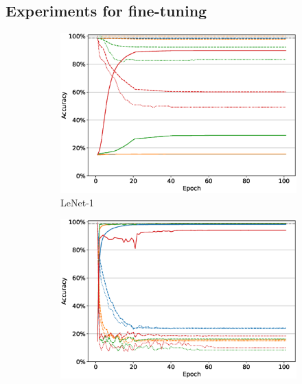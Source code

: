 \subsection{Experiments for fine-tuning} \label{sec:appendix:finetuning-plots}
\begin{figure}
     \centering
     \begin{subfigure}[b]{0.49\textwidth}
         \centering
         \includegraphics[width=\textwidth]{images/finetuning/finetuning_protecting_content_smalllr_thesis_lenet1.eps}
         \caption{LeNet-1}
         \label{fig:finetuning_lenet1_smalllr}
     \end{subfigure}
     \hfill
     \begin{subfigure}[b]{0.49\textwidth}
         \centering
         \includegraphics[width=\textwidth]{images/finetuning/finetuning_protecting_content_largelr_thesis_lenet1.eps}

\end{subfigure}
\end{figure}
